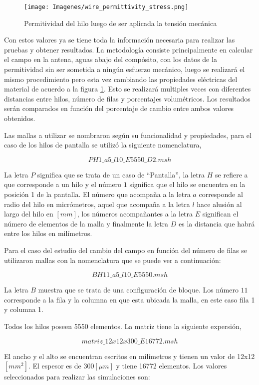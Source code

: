 \documentclass[12pt,letterpaper]{article}
\numberwithin{equation}{section}
\begin{document}
\begin{figure}[H]
	\centering\texttt{[image: Imagenes/wire\_permittivity\_stress.png]}\\
	\caption{Permitividad del hilo luego de ser aplicada la tensión mecánica}
	\label{fig:permittivitycstress}
\end{figure} 

Con estos valores ya se tiene toda la información necesaria para realizar las pruebas y obtener resultados. La metodología consiste principalmente en calcular el campo en la antena, aguas abajo del compósito, con los datos de la permitividad sin ser sometida a ningún esfuerzo mecánico, luego se realizará el mismo procedimiento pero esta vez cambiando las propiedades eléctricas del material de acuerdo a la figura \ref{fig:permittivitycstress}. Esto se realizará multiples veces con diferentes distancias entre hilos, número de filas y porcentajes volumétricos. Los resultados serán comparados en función del porcentaje de cambio entre ambos valores obtenidos.

Las mallas a utilizar se nombraron según su funcionalidad y propiedades, para el caso de los hilos de pantalla se utilizó la siguiente nomenclatura,

$$PH1\_a5\_l10\_E5550\_D2.msh$$

La letra $P$ significa que se trata de un caso de ``Pantalla'', la letra $H$ se refiere a que corresponde a un hilo y el número $1$ significa que el hilo se encuentra en la posición 1 de la pantalla. El número que acompaña a la letra $a$ corresponde al radio del hilo en micrómetros, aquel que acompaña a la letra $l$ hace alusión al largo del hilo en $[mm]$, los números acompañantes a la letra $E$ significan el número de elementos de la malla y finalmente la letra $D$ es la distancia que habrá entre los hilos en milímetros.

Para el caso del estudio del cambio del campo en función del número de filas se utilizaron mallas con la nomenclatura que se puede ver a continuación: 

$$BH11\_a5\_l10\_E5550.msh$$

La letra $B$ muestra que se trata de una configuración de bloque. Los número $11$ corresponde a la fila y la columna en que esta ubicada la malla, en este caso fila 1 y columna 1.

Todos los hilos poseen 5550 elementos. La matriz tiene la siguiente expersión,

$$matriz\_12x12x300\_E16772.msh$$

El ancho y el alto se encuentran escritos en milímetros y tienen un valor de 12x12 $[mm^2]$. El espesor es de 300$[\mu m]$ y tiene 16772 elementos. Los valores seleccionados para realizar las simulaciones son:
\end{document}

